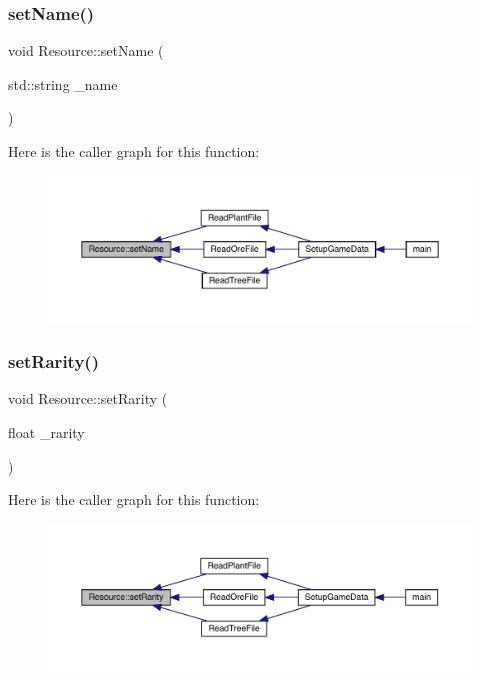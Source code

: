 \subsubsection{\texorpdfstring{set\+Name()}{setName()}}
{\footnotesize\ttfamily void Resource\+::set\+Name (\begin{DoxyParamCaption}\item[{std\+::string}]{\+\_\+name }\end{DoxyParamCaption})}

Here is the caller graph for this function\+:
\nopagebreak
\begin{figure}[H]
\begin{center}
\leavevmode
\includegraphics[width=350pt]{class_resource_a644f765b367972686b6d0b9c7a0ce9dd_icgraph}
\end{center}
\end{figure}
\mbox{\label{class_resource_a50c203483e76ae918b16db164c212e08}} 
\subsubsection{\texorpdfstring{set\+Rarity()}{setRarity()}}
{\footnotesize\ttfamily void Resource\+::set\+Rarity (\begin{DoxyParamCaption}\item[{float}]{\+\_\+rarity }\end{DoxyParamCaption})}

Here is the caller graph for this function\+:
\nopagebreak
\begin{figure}[H]
\begin{center}
\leavevmode
\includegraphics[width=350pt]{class_resource_a50c203483e76ae918b16db164c212e08_icgraph}
\end{center}
\end{figure}
\mbox{\label{class_resource_adc6d68e48afd6949da3211ed2668ddbd}} 
